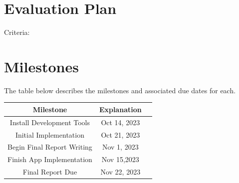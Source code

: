 \documentclass[10pt]{article}
\begin{document}
\section{Evaluation Plan}
   Criteria:
    
\section{Milestones} %
The table below describes the milestones and associated due dates for each.
\begin{center}
\begin{tabular}{ |c|c|c| }
\hline
 Milestone & Explanation \\ \hline
 Install Development Tools &  Oct 14, 2023 \\
 Initial Implementation & Oct 21, 2023 \\
 Begin Final Report Writing & Nov 1, 2023 \\ 
 Finish App Implementation & Nov 15,2023 \\
 Final Report Due & Nov 22, 2023   \\
 \hline
\end{tabular}
\end{center}



\end{document}

